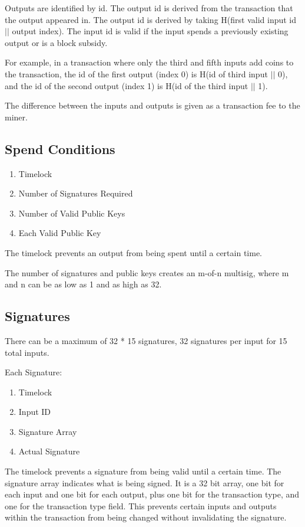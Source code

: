 \documentclass[twocolumn]{article}
\begin{document}
Outputs are identified by id.
The output id is derived from the transaction that the output appeared in.
The output id is derived by taking H(first valid input id $||$ output index).
The input id is valid if the input spends a previously existing output or is a block subsidy.

For example, in a transaction where only the third and fifth inputs add coins to the transaction, the id of the first output (index 0) is H(id of third input $||$ 0), and the id of the second output (index 1) is H(id of the third input $||$ 1).

The difference between the inputs and outputs is given as a transaction fee to the miner.

\subsection{Spend Conditions}
\begin{enumerate}
	\item Timelock
	\item Number of Signatures Required
	\item Number of Valid Public Keys
	\item Each Valid Public Key
\end{enumerate}

The timelock prevents an output from being spent until a certain time.

The number of signatures and public keys creates an m-of-n multisig, where m and n can be as low as 1 and as high as 32.

\subsection{Signatures}
There can be a maximum of 32 * 15 signatures, 32 signatures per input for 15 total inputs.

Each Signature:
\begin{enumerate}
	\item Timelock
	\item Input ID
	\item Signature Array
	\item Actual Signature
\end{enumerate}

The timelock prevents a signature from being valid until a certain time.
The signature array indicates what is being signed.
It is a 32 bit array, one bit for each input and one bit for each output, plus one bit for the transaction type, and one for the transaction type field.
This prevents certain inputs and outputs within the transaction from being changed without invalidating the signature.
\end{document}
